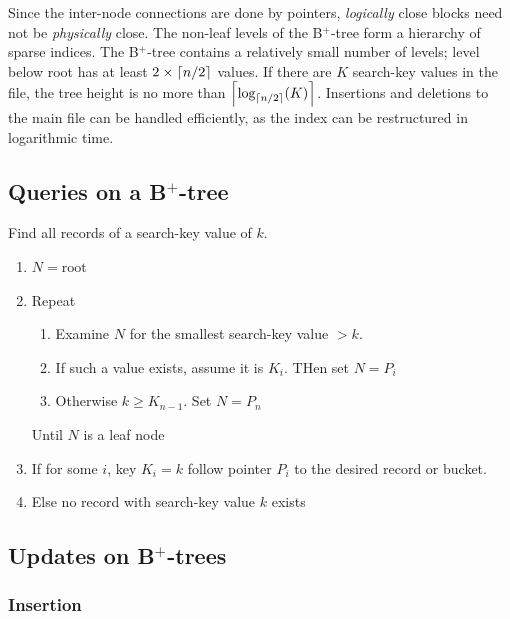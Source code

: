 \documentclass{article}
\begin{document}
Since the inter-node connections are done by pointers, \emph{logically} close blocks need not be \emph{physically} close. The non-leaf levels of the B$^{+}$-tree form a hierarchy of sparse indices. The B$^{+}$-tree contains a relatively small number of levels; level below root has at least $2 \times \left\lceil n/2 \right\rceil$ values. If there are $K$ search-key values in the file, the tree height is no more than $\left\lceil \textrm{log}_{\left\lceil n/2 \right\rceil}(K) \right\rceil$. Insertions and deletions to the main file can be handled efficiently, as the index can be restructured in logarithmic time. 

\subsection{Queries on a B$^{+}$-tree}

Find all records of a search-key value of $k$. 
\begin{enumerate}
  \item $N=\textrm{root}$ 
  \item Repeat 
    \begin{enumerate}
      \item Examine $N$ for the smallest search-key value $>k$. 
      \item If such a value exists, assume it is $K_i$. THen set $N=P_i$ 
      \item Otherwise $k \geq K_{n-1}$. Set $N=P_n$
    \end{enumerate}
    Until $N$ is a leaf node 
  \item If for some $i$, key $K_i = k$ follow pointer $P_i$ to the desired record or bucket. 
  \item Else no record with search-key value $k$ exists
\end{enumerate}

\subsection{Updates on B$^{+}$-trees}

\subsubsection{Insertion}
\end{document}
